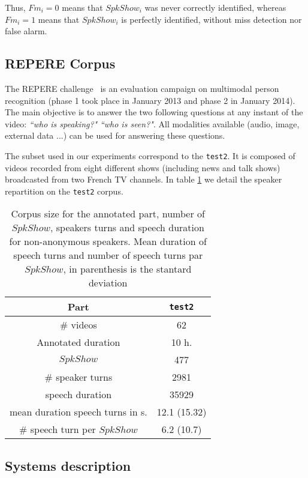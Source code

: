 Thus, $Fm_i=0$ means that $SpkShow_i$ was never correctly identified, whereas $Fm_i=1$ means that $SpkShow_i$ is perfectly identified, without miss detection nor false alarm.

\subsection{REPERE Corpus~\cite{Giraudel2012}}

The REPERE challenge~\cite{KAHN--CBMI--2012} is an evaluation campaign on multimodal person recognition (phase 1 took place in January 2013 and phase 2 in January 2014). The main objective is to answer the two following questions at any instant of the video: \emph{``who is speaking?"} \emph{``who is seen?"}. All modalities available (audio, image, external data ...) can be used for answering these questions. 

The subset used in our experiments correspond to the \texttt{test2}. It is composed of videos recorded from eight different shows (including news and talk shows) broadcasted from two French TV channels. In table \ref{tab:test2} we detail the speaker repartition on the \texttt{test2} corpus.


\begin{table}[ht]
  \centering
  \begin{tabular}{|c|c|}
    \hline
    Part                                & \texttt{test2}    \\
    \hline    
    \# videos                           & 62                \\         
    Annotated duration                  & 10 h.             \\
    \hline      
    $SpkShow$                           & 477               \\
    \# speaker turns                    & 2981              \\
    speech duration                     & 35929             \\
    mean duration speech turns in s.    & 12.1 (15.32)      \\
    \# speech turn per $SpkShow$        & 6.2 (10.7)        \\ 
    \hline                              
  \end{tabular}
  \caption{Corpus size for the annotated part, number of $SpkShow$, speakers turns and speech duration for non-anonymous speakers. Mean duration of speech turns and number of speech turns par $SpkShow$, in parenthesis is the stantard deviation}
  \label{tab:test2}  
\end{table}


\subsection{Systems description}
\label{sec:systems}




